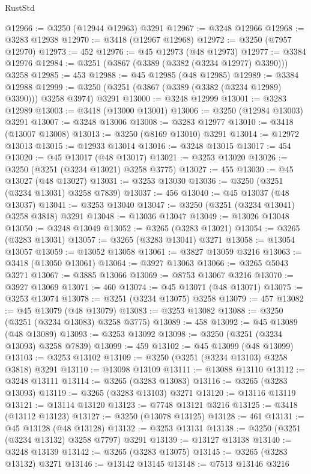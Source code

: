\begin{lexlean}{RustStd}
\begin{coremodule}
@12966 := @3250 (@12944 @12963) @3291
@12967 := @3248 @12966
@12968 := @3283 @12938
@12970 := @3418 (@12967 @12968)
@12972 := @3250 (@7957 @12970)
@12973 := 452
@12976 := @45 @12973 (@48 @12973)
@12977 := @3384 @12976
@12984 := @3251 (@3867 (@3389 (@3382 (@3234 @12977) @3390))) @3258
@12985 := 453
@12988 := @45 @12985 (@48 @12985)
@12989 := @3384 @12988
@12999 := @3250 (@3251 (@3867 (@3389 (@3382 (@3234 @12989) @3390))) @3258 @3974) @3291
@13000 := @3248 @12999
@13001 := @3283 @12989
@13003 := @3418 (@13000 @13001)
@13006 := @3250 (@12984 @13003) @3291
@13007 := @3248 @13006
@13008 := @3283 @12977
@13010 := @3418 (@13007 @13008)
@13013 := @3250 (@8169 @13010) @3291
@13014 := @12972 @13013
@13015 := @12933 @13014
@13016 := @3248 @13015
@13017 := 454
@13020 := @45 @13017 (@48 @13017)
@13021 := @3253 @13020
@13026 := @3250 (@3251 (@3234 @13021) @3258 @3775)
@13027 := 455
@13030 := @45 @13027 (@48 @13027)
@13031 := @3253 @13030
@13036 := @3250 (@3251 (@3234 @13031) @3258 @7839)
@13037 := 456
@13040 := @45 @13037 (@48 @13037)
@13041 := @3253 @13040
@13047 := @3250 (@3251 (@3234 @13041) @3258 @3818) @3291
@13048 := @13036 @13047
@13049 := @13026 @13048
@13050 := @3248 @13049
@13052 := @3265 (@3283 @13021)
@13054 := @3265 (@3283 @13031)
@13057 := @3265 (@3283 @13041) @3271
@13058 := @13054 @13057
@13059 := @13052 @13058
@13061 := @3827 @13059 @3216
@13063 := @3418 (@13050 @13061)
@13064 := @3927 @13063
@13066 := @3265 @5043 @3271
@13067 := @3885 @13066
@13069 := @8753 @13067 @3216
@13070 := @3927 @13069
@13071 := 460
@13074 := @45 @13071 (@48 @13071)
@13075 := @3253 @13074
@13078 := @3251 (@3234 @13075) @3258
@13079 := 457
@13082 := @45 @13079 (@48 @13079)
@13083 := @3253 @13082
@13088 := @3250 (@3251 (@3234 @13083) @3258 @3775)
@13089 := 458
@13092 := @45 @13089 (@48 @13089)
@13093 := @3253 @13092
@13098 := @3250 (@3251 (@3234 @13093) @3258 @7839)
@13099 := 459
@13102 := @45 @13099 (@48 @13099)
@13103 := @3253 @13102
@13109 := @3250 (@3251 (@3234 @13103) @3258 @3818) @3291
@13110 := @13098 @13109
@13111 := @13088 @13110
@13112 := @3248 @13111
@13114 := @3265 (@3283 @13083)
@13116 := @3265 (@3283 @13093)
@13119 := @3265 (@3283 @13103) @3271
@13120 := @13116 @13119
@13121 := @13114 @13120
@13123 := @7748 @13121 @3216
@13125 := @3418 (@13112 @13123)
@13127 := @3250 (@13078 @13125)
@13128 := 461
@13131 := @45 @13128 (@48 @13128)
@13132 := @3253 @13131
@13138 := @3250 (@3251 (@3234 @13132) @3258 @7797) @3291
@13139 := @13127 @13138
@13140 := @3248 @13139
@13142 := @3265 (@3283 @13075)
@13145 := @3265 (@3283 @13132) @3271
@13146 := @13142 @13145
@13148 := @7513 @13146 @3216

\end{coremodule}
\end{lexlean}
